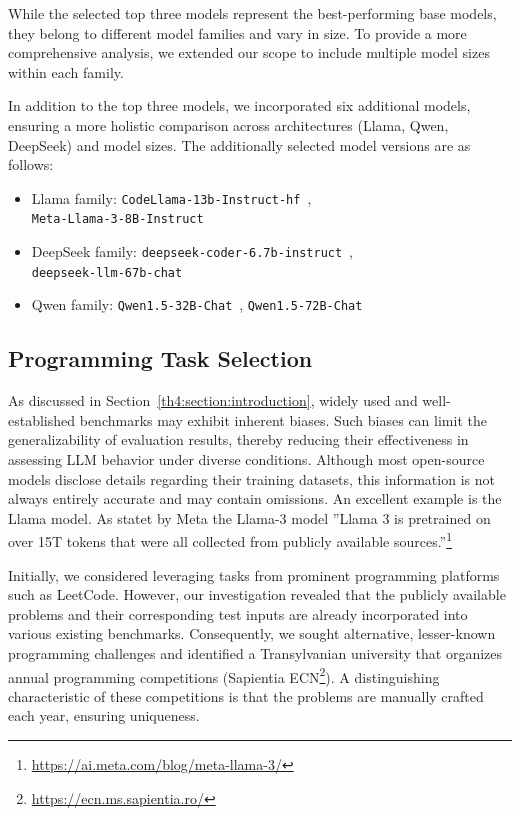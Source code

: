 While the selected top three models represent the best-performing base models, they belong to different model families and vary in size.
To provide a more comprehensive analysis, we extended our scope to include multiple model sizes within each family.

In addition to the top three models, we incorporated six additional models, ensuring a more holistic comparison across architectures (Llama, Qwen, DeepSeek) and model sizes.
The additionally selected model versions are as follows:
\begin{itemize}
	\item Llama family: \texttt{CodeLlama-13b-Instruct-hf}~\cite{CodeLlama-13b-Instruct-hf},\\ \texttt{Meta-Llama-3-8B-Instruct}~\cite{Meta-Llama-3-8B-Instruct}
	\item DeepSeek family: \texttt{deepseek-coder-6.7b-instruct}~\cite{deepseek-coder-6.7b-instruct},\\ \texttt{deepseek-llm-67b-chat}~\cite{deepseek-llm-67b-chat}
	\item Qwen family: \texttt{Qwen1.5-32B-Chat}~\cite{Qwen1.5-32B-Chat}, \texttt{Qwen1.5-72B-Chat}~\cite{Qwen1.5-72B-Chat}
\end{itemize}
\subsection{Programming Task Selection}
\label{th4:section:programming_task_selection}


As discussed in Section~\ref{th4:section:introduction}, widely used and well-established benchmarks may exhibit inherent biases.
Such biases can limit the generalizability of evaluation results, thereby reducing their effectiveness in assessing LLM behavior under diverse conditions.
Although most open-source models disclose details regarding their training datasets, this information is not always entirely accurate and may contain omissions.
An excellent example is the Llama model.
As statet by Meta the Llama-3 model ''Llama 3 is pretrained on over 15T tokens that were all collected from publicly available sources.''\footnote{\url{https://ai.meta.com/blog/meta-llama-3/}}

Initially, we considered leveraging tasks from prominent programming platforms such as LeetCode.
However, our investigation revealed that the publicly available problems and their corresponding test inputs are already incorporated into various existing benchmarks.
Consequently, we sought alternative, lesser-known programming challenges and identified a Transylvanian university that organizes annual programming competitions (Sapientia ECN\footnote{\url{https://ecn.ms.sapientia.ro/}}).
A distinguishing characteristic of these competitions is that the problems are manually crafted each year, ensuring uniqueness.

